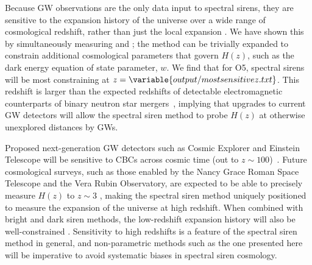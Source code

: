 \documentclass[preprint2,linenumbers]{aastex631}
\begin{document}
Because \ac{GW} observations are the only data input to spectral sirens, they are sensitive to the expansion history of the universe over a wide range of cosmological redshift, rather than just the local expansion \Ho.
We have shown this by simultaneously measuring \Omm{} and \Ho{}; the method can be trivially expanded to constrain additional cosmological parameters that govern $H(z)$, such as the dark energy equation of state parameter, $w$. 
We find that for \acl{O5}, spectral sirens will be most constraining at $z=\variable{output/mostsensitivez.txt}$.
This redshift is larger than the expected redshifts of detectable electromagnetic counterparts of binary neutron star mergers~\citep{kiendrebeogo_updated_2023}, implying that upgrades to current \ac{GW} detectors will allow the spectral siren method to probe $H(z)$ at otherwise unexplored distances by \acp{GW}. 

Proposed next-generation \ac{GW} detectors such as Cosmic Explorer and Einstein Telescope will be sensitive to \acp{CBC} across cosmic time (out to $z\sim100$)~\citep{et_steering_committee_einstein_2020, evans_horizon_2021}.
Future cosmological surveys, such as those enabled by the Nancy Grace Roman Space Telescope and the Vera Rubin Observatory, are expected to be able to precisely measure $H(z)$ to $z\sim3$ \citep{spergel_wide-field_2015}, making the spectral siren method uniquely positioned to measure the expansion of the universe at high redshift.
When combined with bright and dark siren methods, the low-redshift expansion history will also be well-constrained \citep{Chen:2024gdn}.
Sensitivity to high redshifts is a feature of the spectral siren method in general, and non-parametric methods such as the one presented here will be imperative to avoid systematic biases in spectral siren cosmology. 
\end{document}
